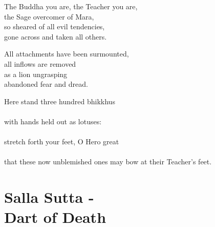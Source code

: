 \begin{MyDescription}{}
The Buddha you are, the Teacher you are,\\
the Sage overcomer of Mara,\\
so sheared of all evil tendencies,\\
gone across and taken all others.
\end{MyDescription}   

\begin{MyDescription}{}
All attachments have been surmounted,\\
all inflows are removed\\
as a lion ungrasping\\
abandoned fear and dread.
\end{MyDescription} 

\begin{MyDescription}{}
Here stand three hundred bhikkhus\\
\\
with hands held out as lotuses:\\
\\
stretch forth your feet, O Hero great\\
\\
that these now unblemished ones may bow at their Teacher's feet.
\end{MyDescription} 

\begin{MyDescription}[(Sn. 548-573)]{}
\end{MyDescription}

\chapter{Salla Sutta -\\ Dart of Death}


